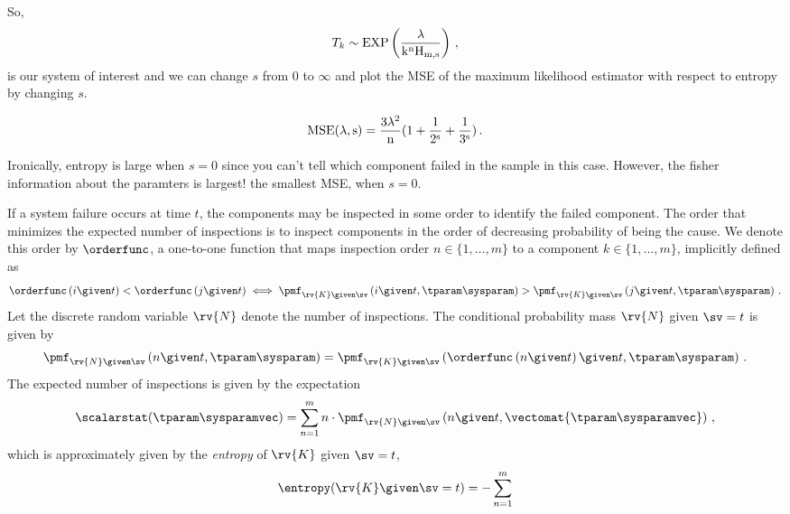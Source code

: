 \documentclass[hidelinks,11pt]{article}
\newcommand{\harmonic}[2]{H_{#1,#2}}
\begin{document}
\begin{enumerate}
    So,
    \begin{equation}
        T_k \sim \rm{EXP}\left(\frac{\lambda}{k^n \harmonic{m}{s}}\right)\,,
    \end{equation}
    is our system of interest and we can change $s$ from $0$ to $\infty$ and plot
    the MSE of the maximum likelihood estimator with respect to entropy by changing
    $s$.
    
    \[
        \rm{MSE}(\lambda, s) = \frac{3 \lambda^2}{n}(1+\frac{1}{2^s}+\frac{1}{3^s})\,.
    \]
    
    Ironically, entropy is large when $s=0$ since you can't tell which component failed in the sample in this case. However, the fisher information about the paramters is largest! the smallest MSE, when $s=0$.
\end{enumerate}















If a system failure occurs at time $t$, the components may be inspected in some order to identify the failed component. The order that minimizes the expected number of inspections is to inspect components in the order of decreasing probability of being the cause. We denote this order by $\orderfunc$, a one-to-one function that maps inspection order $n \in \{1, \ldots, m\}$ to a component $k \in \{1, \ldots, m\}$, implicitly defined as
\begin{equation}
\orderfunc \left(i \given t\right) < \orderfunc\left(j \given t\right) \iff \pmf_{\rv{K} \given \sv}\left(i \given t, \tparam\sysparam\right) > \pmf_{\rv{K} \given \sv}\left(j \given t, \tparam\sysparam\right)\,.
\end{equation}
Let the discrete random variable $\rv{N}$ denote the number of inspections. The conditional probability mass $\rv{N}$ given $\sv = t$ is given by
\begin{equation}
\label{eq:expo_P_N_sigma}
    \pmf_{\rv{N} \given \sv}\left(n \given t, \tparam\sysparam\right) =
    \pmf_{\rv{K} \given \sv}\left(\orderfunc \left(n \given t \right) \given t, \tparam\sysparam \right)\,.
\end{equation}
The expected number of inspections is given by the expectation
\begin{equation}
\scalarstat(\tparam\sysparamvec) = \sum_{n=1}^{m} n \cdot \pmf_{\rv{N} \given \sv}\left(n \given t, \vectomat{\tparam\sysparamvec}\right)\,,
\end{equation}
which is approximately given by the \emph{entropy} of $\rv{K}$ given $\sv = t$,
\begin{equation}
    \entropy(\rv{K} \given \sv = t) = -\sum_{n=1}^{m} 
\end{equation}
\end{document}
